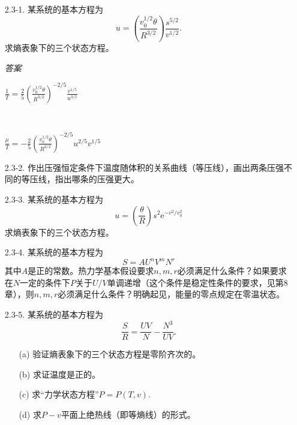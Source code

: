 \begin{enumerate}
	\item[2.3-1.]
		某系统的基本方程为
		\[
			u = \left( \frac{v_0^{1/2} \theta}{R^{3/2}} \right) \frac{s^{5/2}}{v^{1/2}}.
		\]
		求熵表象下的三个状态方程。
		
		\begin{flushright}
		{\it 答案}
		
		$\displaystyle{
			\frac{1}{T} = \frac{2}{5} \left( \frac{v_0^{1/2} \theta}{R^{3/2}} \right)^{-2/5} \frac{v^{1/5}}{u^{3/5}} }$
		
		\ 

		$\displaystyle{
			\frac{\mu}{T} = -\frac{2}{5} \left( \frac{v_0^{1/2} \theta}{R^{3/2}} \right)^{-2/5} u^{2/5} v^{1/5}
		}$		
		\end{flushright}
	\item[2.3-2.]
		作出压强恒定条件下温度随体积的关系曲线（等压线），画出两条压强不同的等压线，指出哪条的压强更大。
	\item[2.3-3.]
		某系统的基本方程为
		\[ 
			u = \left( \frac{\theta}{R} \right) s^2 \mathrm{e}^{-v^2 / v_0^2}
		\]
		求熵表象下的三个状态方程。
	\item[2.3-4.]
		某系统的基本方程为
		\[
			S = AU^n V^m N^r
		\]
		其中$A$是正的常数。热力学基本假设要求$n, m, r$必须满足什么条件？如果要求在$N$一定的条件下$P$关于$U/V$单调递增（这个条件是稳定性条件的要求，见第8章），则$n, m, r$必须满足什么条件？明确起见，能量的零点规定在零温状态。
	\item[2.3-5.]
		某系统的基本方程为
		\[
			\frac{S}{R} = \frac{UV}{N} - \frac{N^3}{UV}.
		\]
		\begin{enumerate}
		\item[(a)]
			验证熵表象下的三个状态方程是零阶齐次的。
		\item[(b)]
			求证温度是正的。
		\item[(c)]
			求“力学状态方程”$P = P(T, v)$.
		\item[(d)]
			求$P-v$平面上绝热线（即等熵线）的形式。
		\end{enumerate}
\end{enumerate}

